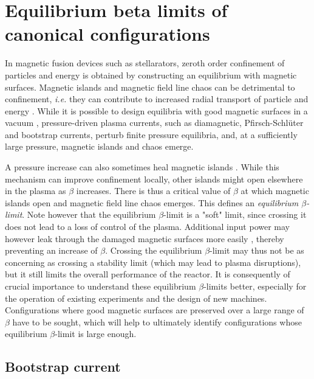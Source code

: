 \documentclass[my_thesis.tex]{subfiles}
\begin{document}
\chapter{Equilibrium beta limits of canonical configurations} \label{ch5.equilibrium_beta_limit}

In magnetic fusion devices such as stellarators, zeroth order confinement of particles and energy is obtained by constructing an equilibrium with magnetic surfaces.
Magnetic islands and magnetic field line chaos can be detrimental to confinement, \textit{i.e.} they can contribute to increased radial transport of particle and energy \citep{Hudson2010}.
While it is possible to design equilibria with good magnetic surfaces in a vacuum \citep{Cary1985,Cary1986,pedersenConfirmationTopologyWendelstein2016}, pressure-driven plasma currents, such as diamagnetic, Pfirsch-Schl\"uter and bootstrap currents, perturb finite pressure equilibria, and, at a sufficiently large pressure, magnetic islands and chaos emerge. 


A pressure increase can also sometimes heal magnetic islands \citep{Bhattacharjee1995}. While this mechanism can improve confinement locally, other islands might open elsewhere in the plasma as $\beta$ increases.
There is thus a critical value of $\beta$ at which magnetic islands open and magnetic field line chaos emerges. This defines an \emph{equilibrium $\beta$-limit}.
Note however that the equilibrium $\beta$-limit is a "soft" limit, since crossing it does not lead to a loss of control of the plasma. Additional input power may however leak through the damaged magnetic surfaces more easily \citep{rechesterElectronHeatTransport1978}, thereby preventing an increase of $\beta$. Crossing the equilibrium $\beta$-limit may thus not be as concerning as crossing a stability limit (which may lead to plasma disruptions), but it still limits the overall performance of the reactor. It is consequently of crucial importance to understand these equilibrium $\beta$-limits better, especially for the operation of existing experiments and the design of new machines. Configurations where good magnetic surfaces are preserved over a large range of $\beta$ have to be sought, which will help to ultimately identify configurations whose equilibrium $\beta$-limit is large enough.

\section{Bootstrap current}\label{sec.bootstrap}
\end{document}

